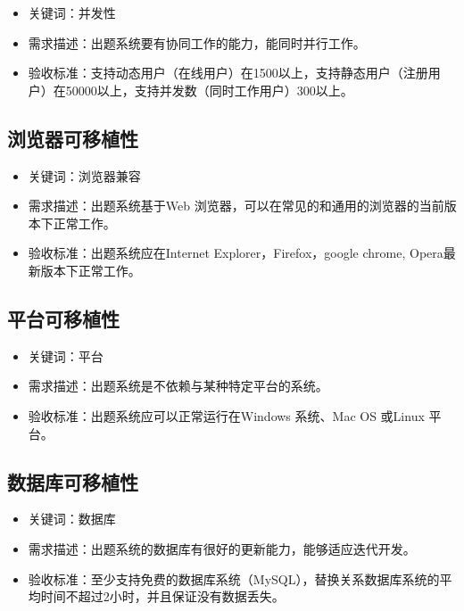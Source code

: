 \documentclass[hyperref, a4paper]{ctexart}
\providecommand{\tightlist}{%
  \setlength{\itemsep}{0pt}\setlength{\parskip}{0pt}}
\begin{document}
\begin{itemize}
\tightlist
\item
  关键词：并发性
\item
  需求描述：出题系统要有协同工作的能力，能同时并行工作。
\item
  验收标准：支持动态用户（在线用户）在1500以上，支持静态用户（注册用户）在50000以上，支持并发数（同时工作用户）300以上。
\end{itemize}

\hypertarget{ux6d4fux89c8ux5668ux53efux79fbux690dux6027}{%
\subsection{浏览器可移植性}\label{ux6d4fux89c8ux5668ux53efux79fbux690dux6027}}

\begin{itemize}
\tightlist
\item
  关键词：浏览器兼容
\item
  需求描述：出题系统基于Web
  浏览器，可以在常见的和通用的浏览器的当前版本下正常工作。
\item
  验收标准：出题系统应在Internet Explorer，Firefox，google chrome,
  Opera最新版本下正常工作。
\end{itemize}

\hypertarget{ux5e73ux53f0ux53efux79fbux690dux6027}{%
\subsection{平台可移植性}\label{ux5e73ux53f0ux53efux79fbux690dux6027}}

\begin{itemize}
\tightlist
\item
  关键词：平台
\item
  需求描述：出题系统是不依赖与某种特定平台的系统。
\item
  验收标准：出题系统应可以正常运行在Windows 系统、Mac OS 或Linux 平台。
\end{itemize}

\hypertarget{ux6570ux636eux5e93ux53efux79fbux690dux6027}{%
\subsection{数据库可移植性}\label{ux6570ux636eux5e93ux53efux79fbux690dux6027}}

\begin{itemize}
\tightlist
\item
  关键词：数据库
\item
  需求描述：出题系统的数据库有很好的更新能力，能够适应迭代开发。
\item
  验收标准：至少支持免费的数据库系统（MySQL），替换关系数据库系统的平均时间不超过2小时，并且保证没有数据丢失。
\end{itemize}
\end{document}
